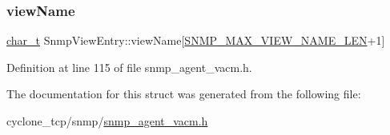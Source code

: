 \subsubsection{\texorpdfstring{view\+Name}{viewName}}
{\footnotesize\ttfamily \hyperlink{compiler__port_8h_a40bb5262bf908c328fbcfbe5d29d0201}{char\+\_\+t} Snmp\+View\+Entry\+::view\+Name\mbox{[}\hyperlink{snmp__common_8h_a8188d8ada88e9fc2c0a6d2010105b14c}{S\+N\+M\+P\+\_\+\+M\+A\+X\+\_\+\+V\+I\+E\+W\+\_\+\+N\+A\+M\+E\+\_\+\+L\+EN}+1\mbox{]}}



Definition at line 115 of file snmp\+\_\+agent\+\_\+vacm.\+h.



The documentation for this struct was generated from the following file\+:\begin{DoxyCompactItemize}
\item 
cyclone\+\_\+tcp/snmp/\hyperlink{snmp__agent__vacm_8h}{snmp\+\_\+agent\+\_\+vacm.\+h}\end{DoxyCompactItemize}
